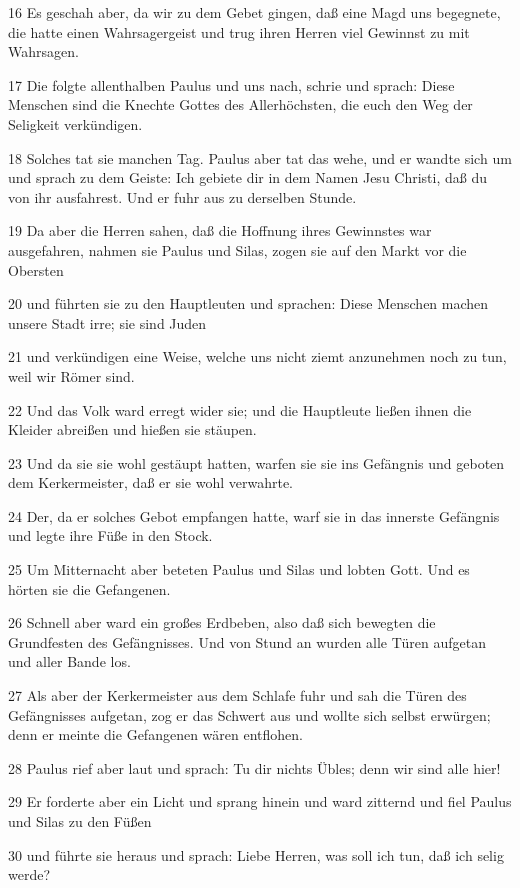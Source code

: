 \par 16 Es geschah aber, da wir zu dem Gebet gingen, daß eine Magd uns begegnete, die hatte einen Wahrsagergeist und trug ihren Herren viel Gewinnst zu mit Wahrsagen.
\par 17 Die folgte allenthalben Paulus und uns nach, schrie und sprach: Diese Menschen sind die Knechte Gottes des Allerhöchsten, die euch den Weg der Seligkeit verkündigen.
\par 18 Solches tat sie manchen Tag. Paulus aber tat das wehe, und er wandte sich um und sprach zu dem Geiste: Ich gebiete dir in dem Namen Jesu Christi, daß du von ihr ausfahrest. Und er fuhr aus zu derselben Stunde.
\par 19 Da aber die Herren sahen, daß die Hoffnung ihres Gewinnstes war ausgefahren, nahmen sie Paulus und Silas, zogen sie auf den Markt vor die Obersten
\par 20 und führten sie zu den Hauptleuten und sprachen: Diese Menschen machen unsere Stadt irre; sie sind Juden
\par 21 und verkündigen eine Weise, welche uns nicht ziemt anzunehmen noch zu tun, weil wir Römer sind.
\par 22 Und das Volk ward erregt wider sie; und die Hauptleute ließen ihnen die Kleider abreißen und hießen sie stäupen.
\par 23 Und da sie sie wohl gestäupt hatten, warfen sie sie ins Gefängnis und geboten dem Kerkermeister, daß er sie wohl verwahrte.
\par 24 Der, da er solches Gebot empfangen hatte, warf sie in das innerste Gefängnis und legte ihre Füße in den Stock.
\par 25 Um Mitternacht aber beteten Paulus und Silas und lobten Gott. Und es hörten sie die Gefangenen.
\par 26 Schnell aber ward ein großes Erdbeben, also daß sich bewegten die Grundfesten des Gefängnisses. Und von Stund an wurden alle Türen aufgetan und aller Bande los.
\par 27 Als aber der Kerkermeister aus dem Schlafe fuhr und sah die Türen des Gefängnisses aufgetan, zog er das Schwert aus und wollte sich selbst erwürgen; denn er meinte die Gefangenen wären entflohen.
\par 28 Paulus rief aber laut und sprach: Tu dir nichts Übles; denn wir sind alle hier!
\par 29 Er forderte aber ein Licht und sprang hinein und ward zitternd und fiel Paulus und Silas zu den Füßen
\par 30 und führte sie heraus und sprach: Liebe Herren, was soll ich tun, daß ich selig werde?
